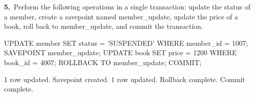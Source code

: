 \noindent\begin{minipage}{\linewidth}
\begingroup{}
{\fontsize{14}{17}\selectfont\textbf{5.}}\ Perform the following operations in a single transaction: update the status of a member, create a savepoint named member\_update, update the price of a book, roll back to member\_update, and commit the transaction.\par
\endgroup\vspace{12pt}


\begin{sqlcode}
UPDATE member SET status = 'SUSPENDED' WHERE member_id = 1007;
SAVEPOINT member_update;
UPDATE book SET price = 1200 WHERE book_id = 4007;
ROLLBACK TO member_update;
COMMIT;
\end{sqlcode}

\vspace{18pt}


\begin{sqlout}[fontsize=\small]
1 row updated.
Savepoint created.
1 row updated.
Rollback complete.
Commit complete.
\end{sqlout}
\end{minipage}\par\vspace{24pt}

